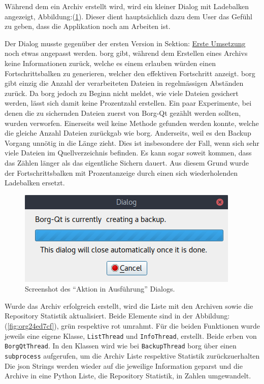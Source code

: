 Während dem ein Archiv erstellt wird, wird ein kleiner Dialog mit Ladebalken
angezeigt, Abbildung:(\ref{fig:org52ca607}). Dieser dient hauptsächlich dazu
dem User das Gefühl zu geben, dass die Applikation noch am Arbeiten ist.

Der Dialog musste gegenüber der ersten Version in Sektion: \hyperref[sec:org040cd93]{Erste Umsetzung} noch
etwas angepasst werden. \gls{borg} gibt, während dem Erstellen eines Archivs
keine Informationen zurück, welche es einem erlauben würden einen
Fortschrittsbalken zu generieren, welcher den effektiven Fortschritt anzeigt.
\gls{borg} gibt einzig die Anzahl der verarbeiteten Dateien in regelmässigen
Abständen zurück. Da \gls{borg} jedoch zu Beginn nicht meldet, wie viele Dateien
gesichert werden, lässt sich damit keine Prozentzahl erstellen. Ein paar
Experimente, bei denen die zu sichernden Dateien zuerst von Borg-Qt gezählt
werden sollten, wurden verworfen. Einerseits weil keine Methode gefunden werden
konnte, welche die gleiche Anzahl Dateien zurückgab wie \gls{borg}. Anderseits,
weil es den Backup Vorgang unnötig in die Länge zieht. Dies ist insbesondere
der Fall, wenn sich sehr viele Dateien im Quellverzeichnis befinden. Es kann
sogar soweit kommen, dass das Zählen länger als das eigentliche Sichern dauert.
Aus diesem Grund wurde der Fortschrittsbalken mit Prozentanzeige durch einen
sich wiederholenden Ladebalken ersetzt.

\begin{figure}[H]
\centering
\includegraphics[width=.4\paperwidth]{pictures/borgqt_progress_v2.png}
\caption{\label{fig:org52ca607}
Screenshot des "`Aktion in Ausführung"' Dialogs.}
\end{figure}

Wurde das Archiv erfolgreich erstellt, wird die Liste mit den Archiven sowie
die Repository Statistik aktualisiert. Beide Elemente sind in der
Abbildung:(\ref{fig:org24ed7cf}), grün respektive rot umrahmt. Für die
beiden Funktionen wurde jeweils eine eigene Klasse, \texttt{ListThread} und
\texttt{InfoThread}, erstellt. Beide erben von \texttt{BorgQtThread}. In den Klassen wird wie
bei \texttt{BackupThread} \gls{borg} über einen \texttt{subprocess} aufgerufen, um die Archiv Liste
respektive Statistik zurückzuerhalten Die \gls{json} Strings werden wieder auf
die jeweilige Information geparst und die Archive in eine Python Liste, die
Repository Statistik, in Zahlen umgewandelt.

